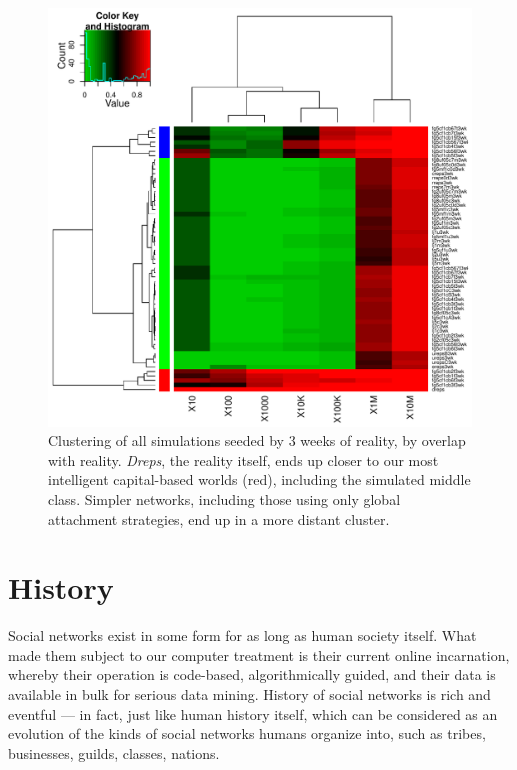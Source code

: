 \documentclass[10pt,oneside]{memoir}
\begin{document}
\begin{Spacing}{2}
\begin{figure}
\begin{center}
    \includegraphics{figures/crop/heatmap-overx-dreps-medians-3wk}
    \caption{Clustering of all simulations seeded by 3 weeks of reality, by overlap with reality.  \emph{Dreps}, the reality itself, ends up closer to our most intelligent capital-based worlds (red), including the simulated middle class.  Simpler networks, including those using only global attachment strategies, end up in a more distant cluster.}
    \label{figure:heatmap-srates-medians-3wk}
\end{center}
\end{figure}
\pagebreak \section{History}
\label{history}

Social networks exist in some form for as long as human society itself.  What made them subject to our computer treatment is their current online incarnation, whereby their operation is code-based, algorithmically guided, and their data is available in bulk for serious data mining.
History of social networks is rich and eventful --- in fact, just like human history itself, which can be considered as an evolution of the kinds of social networks humans organize into, such as tribes, businesses, guilds, classes, nations.



\end{Spacing}
\end{document}
